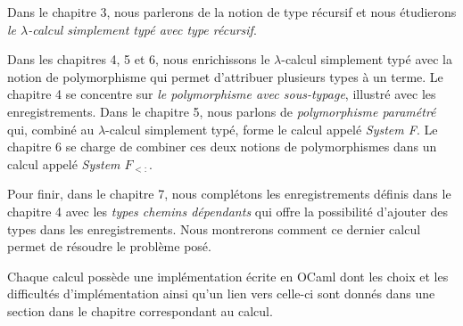 Dans le chapitre 3, nous parlerons de la notion de type récursif et nous
étudierons \textit{le $\lambda$-calcul simplement typé avec type récursif}.

Dans les chapitres 4, 5 et 6, nous enrichissons le $\lambda$-calcul simplement
typé avec la notion de polymorphisme qui permet d'attribuer plusieurs types à un
terme. Le chapitre 4 se concentre sur \textit{le polymorphisme avec sous-typage},
illustré avec les enregistrements. Dans le chapitre 5, nous parlons de
\textit{polymorphisme paramétré} qui, combiné au $\lambda$-calcul simplement typé, forme
le calcul appelé \textit{System F}.
Le chapitre 6 se charge de combiner ces deux notions de polymorphismes dans un
calcul appelé \textit{System $F_{<:}$}.

Pour finir, dans le chapitre 7, nous complétons les enregistrements définis
dans le chapitre 4 avec les \textit{types chemins dépendants} qui offre la possibilité
d'ajouter des types dans les enregistrements. Nous montrerons comment ce dernier
calcul permet de résoudre le problème posé.

Chaque calcul possède une implémentation écrite en OCaml dont les choix et les
difficultés d'implémentation ainsi qu'un lien vers celle-ci sont donnés dans une
section dans le chapitre correspondant au calcul.


